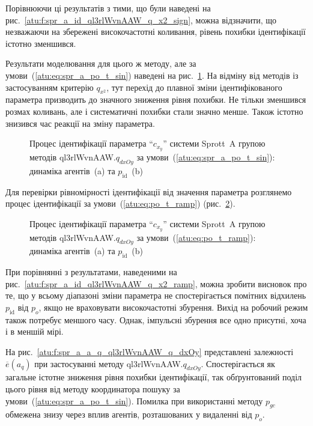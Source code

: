Порівнюючи ці результатів з тими, що були наведені на
рис.~\ref{atu:f:spr_a_id_ql3rlWvnAAW_q_x2_sign}, можна відзначити, що незважаючи
на збережені високочастотні коливання, рівень похибки
ідентифікації істотно зменшився.

Результати моделювання для цього ж методу,
але за умови~(\ref{atu:eq:spr_a_po_t_sin}) наведені на
рис.~\ref{atu:f:spr_a_id_ql3rlWvnAAW_q_dxOy_sin}. На відміну від методів із
застосуванням критерію
$q_{x^2}$, тут перехід до плавної зміни ідентифікованого
параметра призводить до значного зниження рівня похибки. Не
тільки зменшився розмах коливань, але і систематичні похибки
стали значно менше. Також істотно знизився час реакції на
зміну параметра.

\begin{figure}[htb!]
  \caption{Процес ідентифікації параметра ``$c_{x_y}$'' системи Sprott~A групою методів ql3rlWvnAAW.$q_{dxOy}$ за умови~(\ref{atu:eq:spr_a_po_t_sin}): динаміка агентів~(a) та $p_\mathrm{id}$~(b)}
  \label{atu:f:spr_a_id_ql3rlWvnAAW_q_dxOy_sin}
\end{figure}

Для перевірки рівномірності ідентифікації від
значення параметра розглянемо процес ідентифікації за
умови~(\ref{atu:eq:po_t_ramp}) (рис.~\ref{atu:f:spr_a_id_ql3rlWvnAAW_q_dxOy_ramp}).

\begin{figure}[htb!]
  \caption{Процес ідентифікації параметра ``$c_{x_y}$'' системи Sprott~A групою методів ql3rlWvnAAW.$q_{dxOy}$ за умови~(\ref{atu:eq:po_t_ramp}): динаміка агентів~(a) та $p_\mathrm{id}$~(b)}
  \label{atu:f:spr_a_id_ql3rlWvnAAW_q_dxOy_ramp}
\end{figure}

При порівнянні з результатами, наведеними на
рис.~\ref{atu:f:spr_a_id_ql3rlWvnAAW_q_x2_ramp}, можна зробити висновок про те, що у
всьому діапазоні зміни параметра не спостерігається помітних
відхилень
$p_\mathrm{id}$ від
$p_o$, якщо не враховувати високочастотні збурення. Вихід на
робочий режим також потребує меншого часу. Однак, імпульсні збурення
все одно присутні, хоча і в меншій мірі.

На рис.~\ref{atu:f:spr_a_a_q_ql3rlWvnAAW_q_dxOy} представлені залежності
$\overline{e}(a_q)$ при застосуванні методу
ql3rlWvnAAW.$q_{dxOy}$.
Спостерігається як загальне істотне зниження рівня похибки
ідентифікації, так обґрунтований поділ цього рівня від методу
координатора пошуку за умови~(\ref{atu:eq:spr_a_po_t_sin}). Помилка при
використанні методу
$p_{gc}$ обмежена знизу через вплив агентів, розташованих у
видаленні від
$p_o$.

